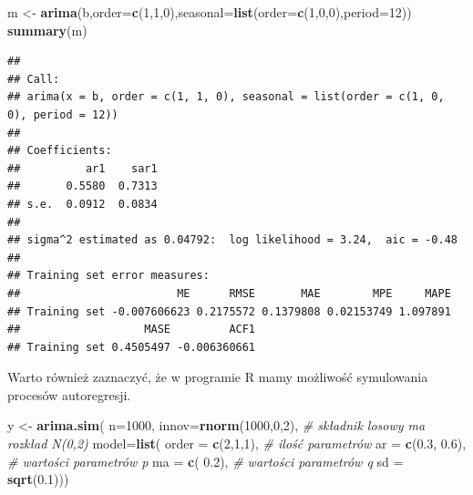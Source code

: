 \documentclass[polish,]{book}
\newenvironment{Shaded}{\begin{snugshade}}{\end{snugshade}}
\newcommand{\CommentTok}[1]{\textcolor[rgb]{0.56,0.35,0.01}{\textit{#1}}}
\newcommand{\DataTypeTok}[1]{\textcolor[rgb]{0.13,0.29,0.53}{#1}}
\newcommand{\DecValTok}[1]{\textcolor[rgb]{0.00,0.00,0.81}{#1}}
\newcommand{\FloatTok}[1]{\textcolor[rgb]{0.00,0.00,0.81}{#1}}
\newcommand{\KeywordTok}[1]{\textcolor[rgb]{0.13,0.29,0.53}{\textbf{#1}}}
\newcommand{\NormalTok}[1]{#1}
\newcommand{\StringTok}[1]{\textcolor[rgb]{0.31,0.60,0.02}{#1}}
\begin{document}
\begin{Shaded}
\begin{Highlighting}[]
\NormalTok{m <-}\StringTok{ }\KeywordTok{arima}\NormalTok{(b,}\DataTypeTok{order=}\KeywordTok{c}\NormalTok{(}\DecValTok{1}\NormalTok{,}\DecValTok{1}\NormalTok{,}\DecValTok{0}\NormalTok{),}\DataTypeTok{seasonal=}\KeywordTok{list}\NormalTok{(}\DataTypeTok{order=}\KeywordTok{c}\NormalTok{(}\DecValTok{1}\NormalTok{,}\DecValTok{0}\NormalTok{,}\DecValTok{0}\NormalTok{),}\DataTypeTok{period=}\DecValTok{12}\NormalTok{))}
\KeywordTok{summary}\NormalTok{(m)}
\end{Highlighting}
\end{Shaded}

\begin{verbatim}
## 
## Call:
## arima(x = b, order = c(1, 1, 0), seasonal = list(order = c(1, 0, 0), period = 12))
## 
## Coefficients:
##          ar1    sar1
##       0.5580  0.7313
## s.e.  0.0912  0.0834
## 
## sigma^2 estimated as 0.04792:  log likelihood = 3.24,  aic = -0.48
## 
## Training set error measures:
##                        ME      RMSE       MAE        MPE     MAPE
## Training set -0.007606623 0.2175572 0.1379808 0.02153749 1.097891
##                   MASE         ACF1
## Training set 0.4505497 -0.006360661
\end{verbatim}

Warto również zaznaczyć, że w programie R mamy możliwość symulowania procesów autoregresji.

\begin{Shaded}
\begin{Highlighting}[]
\NormalTok{y <-}\StringTok{ }\KeywordTok{arima.sim}\NormalTok{( }\DataTypeTok{n=}\DecValTok{1000}\NormalTok{,}
                \DataTypeTok{innov=}\KeywordTok{rnorm}\NormalTok{(}\DecValTok{1000}\NormalTok{,}\DecValTok{0}\NormalTok{,}\DecValTok{2}\NormalTok{), }\CommentTok{# składnik losowy ma rozkład N(0,2)}
                \DataTypeTok{model=}\KeywordTok{list}\NormalTok{(}
                  \DataTypeTok{order =} \KeywordTok{c}\NormalTok{(}\DecValTok{2}\NormalTok{,}\DecValTok{1}\NormalTok{,}\DecValTok{1}\NormalTok{), }\CommentTok{# ilość parametrów}
                  \DataTypeTok{ar =} \KeywordTok{c}\NormalTok{(}\FloatTok{0.3}\NormalTok{, }\FloatTok{0.6}\NormalTok{), }\CommentTok{# wartości parametrów p}
                  \DataTypeTok{ma =} \KeywordTok{c}\NormalTok{( }\FloatTok{0.2}\NormalTok{),     }\CommentTok{# wartości parametrów q}
                  \DataTypeTok{sd =} \KeywordTok{sqrt}\NormalTok{(}\FloatTok{0.1}\NormalTok{)))}
\end{Highlighting}
\end{Shaded}
\end{document}
